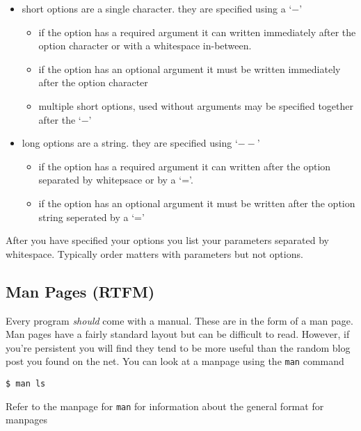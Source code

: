 \documentclass[10pt]{article}
\begin{document}
  \begin{itemize}
  \item 
    short options are a single character. they are specified using a `$-$'
    \begin{itemize}
    \item
      if the option has a required argument it can written immediately after the option character
      or with a whitespace in-between.
    \item
      if the option has an optional argument it must be written 
      immediately after the option character
    \item
      multiple short options, used without arguments may be specified together after the `$-$'
    \end{itemize}
  \item
    long options are a string. they are specified using `$--$'
    \begin{itemize}
    \item
      if the option has a required argument it can written after the option separated by 
      whitepsace or by a `='.
    \item
      if the option has an optional argument it must be written after the option string
      seperated by a `='
    \end{itemize}  
    
  \end{itemize}



  
  After you have specified your options you list your parameters separated by whitespace. Typically order matters with parameters but not options.

   
  \subsection{Man Pages (RTFM)}
  Every program \textit{should} come with a manual. These are in the form of a man page. Man pages have a fairly standard layout but can be difficult to read. However, if you're persistent you will find they tend to be more useful than the random blog post you found on the net. You can look at a manpage using the \texttt{man} command

\begin{verbatim}
$ man ls
\end{verbatim}

  Refer to the manpage for \texttt{man} for information about the general format for manpages
\end{document}
